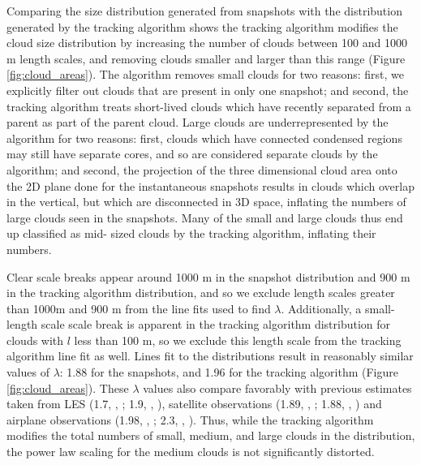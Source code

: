 \documentclass[acp]{copernicus}
\begin{document}
Comparing the size distribution generated from snapshots with the distribution 
generated by the tracking algorithm shows the tracking algorithm modifies
the cloud size distribution by increasing the number of clouds between 100 and 
1000 m length scales, and removing clouds smaller and larger than this range 
(Figure \ref{fig:cloud_areas}).  The algorithm removes small clouds for two 
reasons: first, we explicitly filter out clouds that are present in only one 
snapshot; and second, the tracking algorithm treats short-lived clouds which 
have recently separated from a parent as part of the parent cloud.  Large
clouds are underrepresented by the algorithm for two reasons: first, clouds 
which have connected condensed regions may still have separate cores, and so 
are considered separate clouds by the algorithm; and second, the projection of 
the three dimensional cloud area onto the 2D plane done for the instantaneous 
snapshots results in clouds which overlap in the vertical, but which are 
disconnected in 3D space, inflating the numbers of large clouds seen in the 
snapshots.  Many of the small and large clouds thus end up classified as mid-
sized clouds by the tracking algorithm, inflating their numbers.

Clear scale breaks appear around 1000 m in the snapshot distribution and 900 m 
in the tracking algorithm distribution, and so we exclude length scales greater 
than 1000m and 900 m from the line fits used to find $\lambda$.  Additionally, 
a small-length scale scale break is apparent in the tracking algorithm 
distribution for clouds with $l$ less than 100 m, so we exclude this length 
scale from the tracking algorithm line fit as well.  Lines fit to the 
distributions result in reasonably similar values of $\lambda$: 1.88 for 
the snapshots, and 1.96 for the tracking algorithm (Figure 
\ref{fig:cloud_areas}).  These $\lambda$ values also compare favorably 
with previous estimates taken from LES (1.7, \citeauthor{Neggers2003},
\citeyear{Neggers2003}; 1.9, \citeauthor{Jiang2008}, \citeyear{Jiang2008}), 
satellite observations (1.89, \citeauthor{Cahalan1989},
\citeyear{Cahalan1989}; 1.88, \citeauthor{Zhao2007}, \citeyear{Zhao2007})
and airplane observations (1.98, \citeauthor{Benner1998}, 
\citeyear{Benner1998}; 2.3, \citeauthor{Jiang2008}, \citeyear{Jiang2008}).
Thus, while the tracking algorithm modifies the total numbers of small, medium, 
and large clouds in the distribution, the power law scaling for the medium 
clouds is not significantly distorted.

\end{document}

